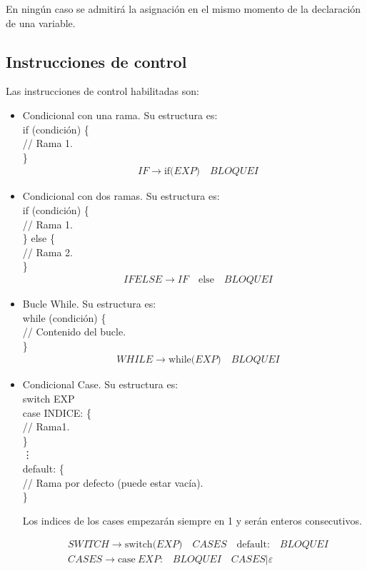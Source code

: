 \documentclass[a4paper, 12pt]{article}
\begin{document}
En ningún caso se admitirá la asignación en el mismo momento de la declaración de una variable.

\subsection{Instrucciones de control}
Las instrucciones de control habilitadas son:
\begin{itemize}
\item Condicional con una rama. Su estructura es:\\
\null\quad\quad if (condición) \{ \\
\null\quad\quad\quad\quad // Rama 1.\\
\null\quad\quad \}
\begin{align*}
&IF \rightarrow \textrm{if(}EXP\textrm{)} \quad  BLOQUEI
\end{align*}
\item Condicional con dos ramas. Su estructura es:\\
\null\quad\quad if (condición) \{ \\
\null\quad\quad\quad\quad // Rama 1.\\
\null\quad\quad \} else \{ \\
\null\quad\quad\quad\quad // Rama 2.\\
\null\quad\quad \}
\begin{align*}
&IFELSE \rightarrow IF\quad \textrm{else} \quad  BLOQUEI
\end{align*}
\item Bucle While. Su estructura es:\\
\null\quad\quad while (condición) \{ \\
\null\quad\quad\quad\quad // Contenido del bucle.\\
\null\quad\quad \}
\begin{align*}
&WHILE \rightarrow \textrm{while(}EXP\textrm{)} \quad  BLOQUEI
\end{align*}
\newpage

\item Condicional Case. Su estructura es:\\
\null\quad\quad switch EXP\\
\null\quad\quad case INDICE: \{ \\
\null\quad\quad\quad\quad // Rama1.\\
\null\quad\quad \}\\
\null\quad\quad\quad\quad \vdots\\
\null\quad\quad default: \{ \\
\null\quad\quad\quad\quad // Rama por defecto (puede estar vacía).\\
\null\quad\quad \}

Los indices de los cases empezarán siempre en 1 y serán enteros consecutivos.

\begin{align*}
&SWITCH \rightarrow \textrm{switch(}EXP\textrm{)}\quad CASES \quad \textrm{default:}\quad BLOQUEI\\
&CASES \rightarrow \textrm{case}\ EXP\textrm{:}\quad BLOQUEI \quad CASES | \varepsilon
\end{align*}
\end{itemize}
\end{document}
